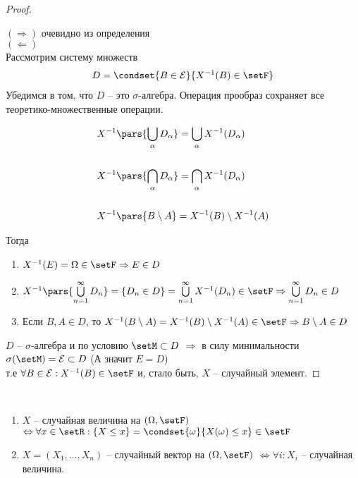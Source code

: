 \begin{proof}~

  $(\Rightarrow)$ очевидно из определения\\

  $(\Leftarrow)$ \\
  Рассмотрим систему множеств
  \begin{align*}
    D = \condset{B \in \mathcal{E}}{X^{-1}(B) \in \setF}
  \end{align*}
  Убедимся в том, что $D$ -- это $\sigma$-алгебра. 
  Операция прообраз сохраняет все теоретико-множественные операции.

  \begin{align*}
    &X^{-1}\pars{\bigcup_{\alpha} D_{\alpha}} = \bigcup_{\alpha} X^{-1} (D_{\alpha})\\\\
    &X^{-1}\pars{\bigcap_{\alpha} D_{\alpha}} = \bigcap_{\alpha} X^{-1} (D_{\alpha})\\\\
    &X^{-1}\pars{B \setminus A} = X^{-1} (B) \setminus X^{-1} (A)
  \end{align*}

  Тогда
  \begin{enumerate}
    \item 
      $X^{-1}(E) = \Omega \in \setF \Rightarrow E \in D$

    \item  
      $X^{-1}\pars{\bigcup\limits_{n = 1}^{\infty} D_n} = \{ D_n \in D \} = 
      \bigcup\limits_{n = 1}^{\infty} X^{-1}(D_n) \in \setF 
      \Rightarrow \bigcup\limits_{n = 1}^{\infty} D_n \in D$

    \item
      Если $B, A \in D$, то
      $X^{-1}(B \setminus A) = X^{-1}(B) \setminus X^{-1}(A) \in \setF 
      \Rightarrow B \setminus A \in D$
  \end{enumerate}

  $D$ -- $\sigma$-алгебра и по условию $\setM \subset D$
  $\Rightarrow$ в силу минимальности $\sigma(\setM) = \mathcal{E} \subset D$ (А значит $E = D$)\\
  т.е $\forall  B \in \mathcal{E} : X^{-1}(B) \in \setF$
  и, стало быть, $X$ -- случайный элемент.
\end{proof}

\begin{corollary}~

  \begin{enumerate}
    \item 
      $X$ -- случайная величина на $(\Omega, \setF)$
      $\Leftrightarrow \forall x \in \setR :
       \{ X \leq x \} = 
      \condset{\omega}{X(\omega) \leq x} \in \setF$

    \item $X = (X_1, \ldots, X_n)$ -- случайный вектор на $(\Omega, \setF)$
          $\Leftrightarrow \forall i : X_i$ -- случайная величина.
  \end{enumerate}

\end{corollary}

